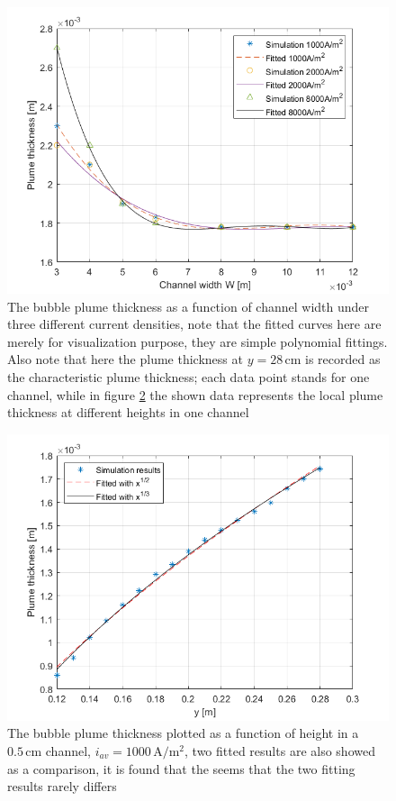 \begin{figure}
    \centering
    \includegraphics[scale=0.7]{plumethickness.png}
    \caption{The bubble plume thickness as a function of channel width under three different current densities, note that the fitted curves here are merely for visualization purpose, they are simple polynomial fittings. Also note that here the plume thickness at $y = 28 \, \mathrm{cm}$ is recorded as the characteristic plume thickness; each data point stands for one channel, while in figure \ref{plumevsheight} the shown data represents the local plume thickness at different heights in one channel}
    \label{plumethickness}
\end{figure}

\begin{figure}
    \centering
    \includegraphics[scale = 0.7]{plumevsheight.png}
    \caption{The bubble plume thickness plotted as a function of height in a $0.5 \, \mathrm{cm}$ channel, $i_{av} = 1000 \, \mathrm{A/m^2}$, two fitted results are also showed as a comparison, it is found that the seems that the two fitting results rarely differs}
    \label{plumevsheight}
\end{figure}

